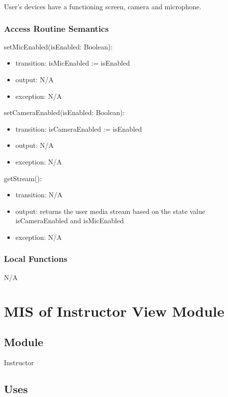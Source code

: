 \documentclass[12pt, titlepage]{article}
\begin{document}
User's devices have a functioning screen, camera and microphone.

\subsubsection{Access Routine Semantics}

\noindent setMicEnabled(isEnabled: Boolean):
\begin{itemize}
\item transition: isMicEnabled := isEnabled
\item output: N/A
\item exception: N/A
\end{itemize}

\noindent setCameraEnabled(isEnabled: Boolean):
\begin{itemize}
\item transition: isCameraEnabled := isEnabled
\item output: N/A
\item exception: N/A
\end{itemize}


\noindent getStream():
\begin{itemize}
\item transition: N/A
\item output: returns the user media stream based on the state value
  isCameraEnabled and isMicEnabled
\item exception: N/A
\end{itemize}

\subsubsection{Local Functions}

N/A


\section{MIS of Instructor View Module} \label{sec:instrcview}

\subsection{Module}

Instructor

\subsection{Uses}
\end{document}
